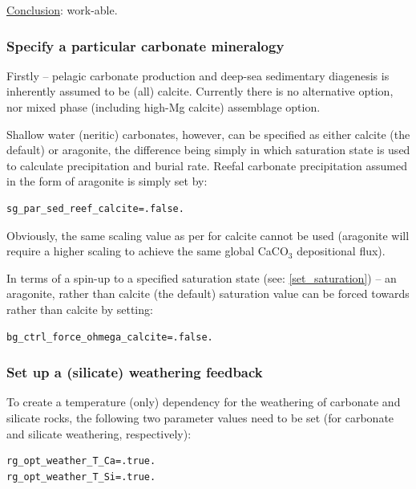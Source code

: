 \documentclass[11pt,fleqn]{book} %
\begin{document}
\begin{enumerate}
\uline{Conclusion}: work-able.

\end{enumerate}

%
\subsubsection{Specify a particular carbonate mineralogy}\label{aragonite}

\noindent Firstly -- pelagic carbonate production and deep-sea sedimentary diagenesis is inherently assumed to be (all) calcite. Currently there is no alternative option, nor mixed phase (including high-Mg calcite) assemblage option.

Shallow water (neritic) carbonates, however, can be specified as either calcite (the default) or aragonite, the difference being simply in which saturation state is used to calculate precipitation and burial rate. Reefal carbonate precipitation assumed in the form of aragonite is simply set by:
\vspace{-1mm}\begin{verbatim}
sg_par_sed_reef_calcite=.false.
\end{verbatim}\vspace{-1mm}

\noindent Obviously, the same scaling value as per for calcite cannot be used (aragonite will require a higher scaling to achieve the same global CaCO${_3}$ depositional flux).

In terms of a spin-up to a specified saturation state (see: \ref{set_saturation}) -- an aragonite, rather than calcite (the default) saturation value can be forced towards rather than calcite by setting: 
\vspace{-1mm}\begin{verbatim}
bg_ctrl_force_ohmega_calcite=.false.
\end{verbatim}\vspace{-1mm}

%
\subsubsection{Set up a (silicate) weathering feedback}\label{weatheringfeedback}

\noindent To create a temperature (only) dependency for the weathering of carbonate and silicate rocks, the following two parameter values need to be set (for carbonate and silicate weathering, respectively):
\vspace{-5mm}\begin{verbatim}
rg_opt_weather_T_Ca=.true.
rg_opt_weather_T_Si=.true.
\end{verbatim}\vspace{-1mm}
\end{document}
